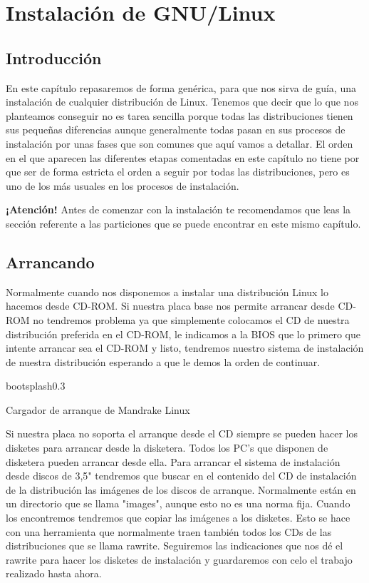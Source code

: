 
\chapter{Instalación de GNU/Linux}
\label{instalacion.tex}

\section{Introducción}

En este capítulo repasaremos de forma  genérica, para que nos sirva de
guía, una instalación de cualquier  distribución de Linux. Tenemos que
decir que lo que nos planteamos  conseguir no es tarea sencilla porque
todas  las  distribuciones  tienen  sus  pequeñas  diferencias  aunque
generalmente todas pasan en sus procesos de instalación por unas fases
que son comunes que aquí vamos a detallar. El orden en el que aparecen
las  diferentes  etapas  comentadas  en este  capítulo  no  tiene  por
que  ser de  forma  estricta el orden a  seguir  por todas  las
distribuciones, pero  es uno  de los  más usuales  en los  procesos de
instalación.

{\bf ¡Atención!} Antes de comenzar  con la instalación te recomendamos
que leas la sección referente a las particiones que se puede encontrar
en este mismo capítulo.

\section{Arrancando}

Normalmente cuando nos disponemos a instalar una distribución Linux lo
hacemos desde CD-ROM. Si nuestra placa base nos permite arrancar desde
CD-ROM no  tendremos problema  ya que simplemente  colocamos el  CD de
nuestra distribución  preferida en el  CD-ROM, le indicamos a  la BIOS
que lo primero  que intente arrancar sea el CD-ROM  y listo, tendremos
nuestro sistema de instalación de nuestra distribución esperando a que
le demos la orden de continuar.

\begin{figura}{bootsplash}{0.3}
\caption{Cargador de arranque de Mandrake Linux}
\end{figura}

Si nuestra placa no soporta el  arranque desde el CD siempre se pueden
hacer los  disketes para arrancar  desde la disketera. Todos  los PC's
que disponen de disketera pueden arrancar desde ella. Para arrancar el
sistema de instalación desde discos de 3,5" tendremos que buscar en el
contenido del CD de instalación de la distribución las imágenes de los
discos de  arranque. Normalmente están  en un directorio que  se llama
"images",  aunque  esto no es  una  norma fija.  Cuando  los
encontremos tendremos que copiar las  imágenes a los disketes. Esto se
hace  con una  herramienta  que normalmente  traen  también todos  los
CDs  de  las  distribuciones  que se  llama  rawrite.  Seguiremos  las
indicaciones  que  nos  dé  el  rawrite para  hacer  los  disketes  de
instalación y guardaremos con celo el trabajo realizado hasta ahora.

